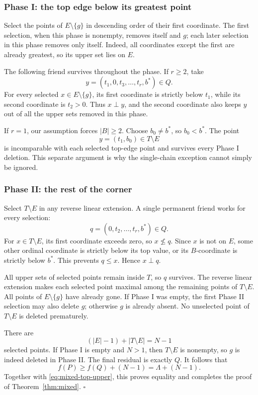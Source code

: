 \documentclass[11pt,letterpaper]{article}
\theoremstyle{definition}
\theoremstyle{remark}
\begin{document}
\subsubsection{Phase I: the top edge below its greatest point}
Select the points of $E\setminus\{g\}$ in descending order of their
first coordinate. The first selection, when this phase is nonempty,
removes itself and $g$; each later selection in this phase removes only
itself. Indeed, all coordinates except the first are already greatest,
so its upper set lies on $E$.

The following friend survives throughout the phase. If $r\ge2$, take
\[
 y=(t_1,0,t_3,\ldots,t_r,b^*)\in Q.
\]
For every selected $x\in E\setminus\{g\}$, its first coordinate is
strictly below $t_1$, while its second coordinate is $t_2>0$. Thus
$x\perp y$, and the second coordinate also keeps $y$ out of all the upper
sets removed in this phase.

If $r=1$, our assumption forces $|B|\ge2$. Choose $b_0\ne b^*$, so
$b_0<b^*$. The point
\[
 y=(t_1,b_0)\in T\setminus E
\]
is incomparable with each selected top-edge point and survives every
Phase I deletion. This separate argument is why the single-chain
exception cannot simply be ignored.

\subsubsection{Phase II: the rest of the corner}
Select $T\setminus E$ in any reverse linear extension. A single permanent
friend works for every selection:
\[
 q=(0,t_2,\ldots,t_r,b^*)\in Q.
\]
For $x\in T\setminus E$, its first coordinate exceeds zero, so
$x\not\le q$. Since $x$ is not on $E$, some other ordinal coordinate is
strictly below its top value, or its $B$-coordinate is strictly below
$b^*$. This prevents $q\le x$. Hence $x\perp q$.

All upper sets of selected points remain inside $T$, so $q$ survives.
The reverse linear extension makes each selected point maximal among the
remaining points of $T\setminus E$. All points of $E\setminus\{g\}$
have already gone. If Phase I was empty, the first Phase II selection may
also delete $g$; otherwise $g$ is already absent. No unselected point of
$T\setminus E$ is deleted prematurely.

There are
\[
 (|E|-1)+|T\setminus E|=N-1
\]
selected points. If Phase I is empty and $N>1$, then $T\setminus E$ is
nonempty, so $g$ is indeed deleted in Phase II. The final residual is
exactly $Q$. It follows that
\[
 f(P)\ge f(Q)+(N-1)=\Lambda+(N-1).
\]
Together with \eqref{eq:mixed-top-upper}, this proves equality and completes
the proof of Theorem~\ref{thm:mixed}.
\hfill$\square$
\end{document}
